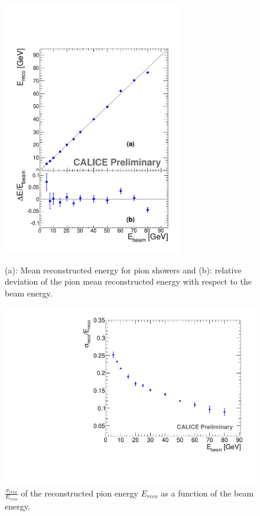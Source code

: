 \begin{figure}
 \begin{minipage}[t]{0.49\textwidth}
 \begin{center}
 \includegraphics*[width=0.7\textwidth,keepaspectratio]{Calorimeter/SDHCAL_GRPC/figures/Energy-Linearity-BEST.pdf}
	\caption{(a): Mean reconstructed energy for pion showers and (b): relative deviation of the pion mean reconstructed energy with respect to the beam energy.}
 \end{center}
 \end{minipage}
 \label{fig:Calorimeter:SDHCAL_GRPC:Linearity}
 \hspace{0.02\textwidth}
 \begin{minipage}[t]{0.49\textwidth}
 \begin{center}
 \includegraphics*[width=\textwidth,keepaspectratio]{Calorimeter/SDHCAL_GRPC/figures/Energy-Resolution-BEST.pdf}
 \caption{ $\frac{\sigma_{reco}}{E_{reco}}$ of the reconstructed pion energy $E_{reco}$ as a function of the beam energy. }
 \end{center}
 \end{minipage}
 \label{fig:Calorimeter:SDHCAL_GRPC:Resolution}
 \end{figure}


